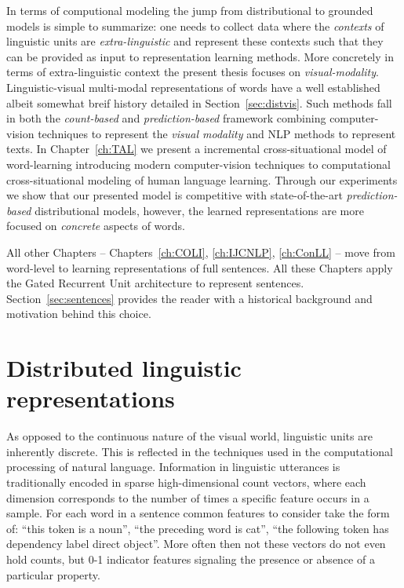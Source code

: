 In terms of computional modeling the jump from 
distributional to grounded models is simple to summarize: one needs to collect data where
the \emph{contexts} of linguistic units are \emph{extra-linguistic} and represent these contexts such
that they can be provided as input to representation learning methods.
More concretely in terms of extra-linguistic context the present thesis focuses on \emph{visual-modality}.
Linguistic-visual multi-modal representations of words have a well established albeit somewhat breif history 
detailed in Section~\ref{sec:distvis}. Such methods fall in both the \emph{count-based}
and \emph{prediction-based} framework combining computer-vision techniques to represent the \emph{visual
modality} and NLP methods to represent texts. In Chapter~\ref{ch:TAL} we present a incremental cross-situational
model of word-learning introducing modern computer-vision techniques to computational cross-situational modeling of 
human language learning. Through our experiments we show that our presented model is competitive with state-of-the-art
\emph{prediction-based} distributional models, however, the learned representations are more focused on
\emph{concrete} aspects of words. 

All other Chapters -- Chapters~\ref{ch:COLI}, \ref{ch:IJCNLP}, \ref{ch:ConLL} -- 
move from word-level to learning representations of full sentences. All these Chapters apply
the Gated Recurrent Unit architecture to represent sentences. Section~\ref{sec:sentences}
provides the reader with a historical background and motivation behind this choice. 


\section{Distributed linguistic representations}
\label{introducion}
As opposed to the continuous nature of the visual world, linguistic units
are inherently discrete. This is reflected in the techniques used in the
computational processing of natural language.
Information in linguistic utterances is traditionally encoded
in sparse high-dimensional count vectors, where each
dimension corresponds to the number of times a specific feature occurs in a
sample. For each word in a sentence common features to consider take the form of:
``this token is a noun'', ``the preceding word is cat'',
``the following token has dependency label direct object''.
More often then not these vectors do not even hold counts, but 0-1
indicator features signaling the presence or absence of a particular property.

